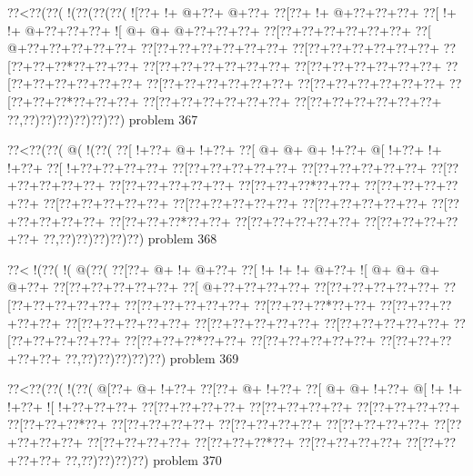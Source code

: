 \vbox{\vbox{\goo
\0??<\0??(\0??(\- !(\0??(\0??(\0??(
\- ![\0??+\- !+\- @+\0??+\- @+\0??+
\0??[\0??+\- !+\- @+\0??+\0??+\0??+
\0??[\- !+\- !+\- @+\0??+\0??+\0??+
\- ![\- @+\- @+\- @+\0??+\0??+\0??+
\0??[\0??+\0??+\0??+\0??+\0??+\0??+
\0??[\- @+\0??+\0??+\0??+\0??+\0??+
\0??[\0??+\0??+\0??+\0??+\0??+\0??+
\0??[\0??+\0??+\0??+\0??+\0??+\0??+
\0??[\0??+\0??+\0??*\0??+\0??+\0??+
\0??[\0??+\0??+\0??+\0??+\0??+\0??+
\0??[\0??+\0??+\0??+\0??+\0??+\0??+
\0??[\0??+\0??+\0??+\0??+\0??+\0??+
\0??[\0??+\0??+\0??+\0??+\0??+\0??+
\0??[\0??+\0??+\0??+\0??+\0??+\0??+
\0??[\0??+\0??+\0??*\0??+\0??+\0??+
\0??[\0??+\0??+\0??+\0??+\0??+\0??+
\0??[\0??+\0??+\0??+\0??+\0??+\0??+
\0??,\0??)\0??)\0??)\0??)\0??)\0??)
}
\hfil problem 367\hfil\break
}

\vbox{\vbox{\goo
\0??<\0??(\0??(\- @(\- !(\0??(
\0??[\- !+\0??+\- @+\- !+\0??+
\0??[\- @+\- @+\- @+\- !+\0??+
\- @[\- !+\0??+\- !+\- !+\0??+
\0??[\- !+\0??+\0??+\0??+\0??+
\0??[\0??+\0??+\0??+\0??+\0??+
\0??[\0??+\0??+\0??+\0??+\0??+
\0??[\0??+\0??+\0??+\0??+\0??+
\0??[\0??+\0??+\0??+\0??+\0??+
\0??[\0??+\0??+\0??*\0??+\0??+
\0??[\0??+\0??+\0??+\0??+\0??+
\0??[\0??+\0??+\0??+\0??+\0??+
\0??[\0??+\0??+\0??+\0??+\0??+
\0??[\0??+\0??+\0??+\0??+\0??+
\0??[\0??+\0??+\0??+\0??+\0??+
\0??[\0??+\0??+\0??*\0??+\0??+
\0??[\0??+\0??+\0??+\0??+\0??+
\0??[\0??+\0??+\0??+\0??+\0??+
\0??,\0??)\0??)\0??)\0??)\0??)
}
\hfil problem 368\hfil\break
}

\vbox{\vbox{\goo
\0??<\- !(\0??(\- !(\- @(\0??(
\0??[\0??+\- @+\- !+\- @+\0??+
\0??[\- !+\- !+\- !+\- @+\0??+
\- ![\- @+\- @+\- @+\- @+\0??+
\0??[\0??+\0??+\0??+\0??+\0??+
\0??[\- @+\0??+\0??+\0??+\0??+
\0??[\0??+\0??+\0??+\0??+\0??+
\0??[\0??+\0??+\0??+\0??+\0??+
\0??[\0??+\0??+\0??+\0??+\0??+
\0??[\0??+\0??+\0??*\0??+\0??+
\0??[\0??+\0??+\0??+\0??+\0??+
\0??[\0??+\0??+\0??+\0??+\0??+
\0??[\0??+\0??+\0??+\0??+\0??+
\0??[\0??+\0??+\0??+\0??+\0??+
\0??[\0??+\0??+\0??+\0??+\0??+
\0??[\0??+\0??+\0??*\0??+\0??+
\0??[\0??+\0??+\0??+\0??+\0??+
\0??[\0??+\0??+\0??+\0??+\0??+
\0??,\0??)\0??)\0??)\0??)\0??)
}
\hfil problem 369\hfil\break
}

\vbox{\vbox{\goo
\0??<\0??(\0??(\- !(\0??(
\- @[\0??+\- @+\- !+\0??+
\0??[\0??+\- @+\- !+\0??+
\0??[\- @+\- @+\- !+\0??+
\- @[\- !+\- !+\- !+\0??+
\- ![\- !+\0??+\0??+\0??+
\0??[\0??+\0??+\0??+\0??+
\0??[\0??+\0??+\0??+\0??+
\0??[\0??+\0??+\0??+\0??+
\0??[\0??+\0??+\0??*\0??+
\0??[\0??+\0??+\0??+\0??+
\0??[\0??+\0??+\0??+\0??+
\0??[\0??+\0??+\0??+\0??+
\0??[\0??+\0??+\0??+\0??+
\0??[\0??+\0??+\0??+\0??+
\0??[\0??+\0??+\0??*\0??+
\0??[\0??+\0??+\0??+\0??+
\0??[\0??+\0??+\0??+\0??+
\0??,\0??)\0??)\0??)\0??)
}
\hfil problem 370\hfil\break
}

